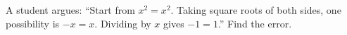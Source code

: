 A student argues: ``Start from $x^2=x^2$. Taking square roots of both sides, one possibility is $-x=x$. Dividing by $x$ gives $-1=1$.'' Find the error.
